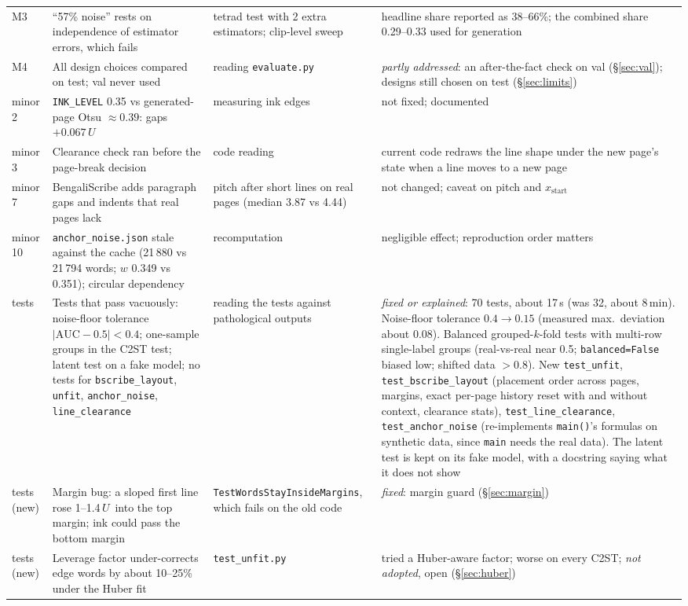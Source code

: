 \documentclass[11pt,a4paper]{article}
\newcommand{\U}{\ensuremath{U}}
\begin{document}
{\begin{longtable}{>{\raggedright\arraybackslash}p{1.1cm}>{\raggedright\arraybackslash}p{5.0cm}>{\raggedright\arraybackslash}p{3.4cm}>{\raggedright\arraybackslash}p{5.0cm}}
M3 & ``57\% noise'' rests on independence of estimator errors, which fails & tetrad test with 2 extra estimators; clip-level sweep & headline share reported as 38--66\%; the combined share 0.29--0.33 used for generation\\
M4 & All design choices compared on test; val never used & reading \texttt{evaluate.py} & \emph{partly addressed}: an after-the-fact check on val (\S\ref{sec:val}); designs still chosen on test (\S\ref{sec:limits})\\
minor 2 & \texttt{INK\_LEVEL} 0.35 vs generated-page Otsu $\approx0.39$: gaps $+0.067\,\U$ & measuring ink edges & not fixed; documented\\
minor 3 & Clearance check ran before the page-break decision & code reading & current code redraws the line shape under the new page's state when a line moves to a new page\\
minor 7 & BengaliScribe adds paragraph gaps and indents that real pages lack & pitch after short lines on real pages (median 3.87 vs 4.44) & not changed; caveat on pitch and $x_\text{start}$\\
minor 10 & \texttt{anchor\_noise.json} stale against the cache (21\,880 vs 21\,794 words; $w$ 0.349 vs 0.351); circular dependency & recomputation & negligible effect; reproduction order matters\\
tests & Tests that pass vacuously: noise-floor tolerance $|\text{AUC}-0.5|<0.4$; one-sample groups in the C2ST test; latent test on a fake model; no tests for \texttt{bscribe\_layout}, \texttt{unfit}, \texttt{anchor\_noise}, \texttt{line\_clearance} & reading the tests against pathological outputs & \emph{fixed or explained}: 70 tests, about 17\,s (was 32, about 8\,min). Noise-floor tolerance $0.4\to0.15$ (measured max.\ deviation about 0.08). Balanced grouped-$k$-fold tests with multi-row single-label groups (real-vs-real near 0.5; \texttt{balanced=False} biased low; shifted data $>0.8$). New \texttt{test\_unfit}, \texttt{test\_bscribe\_layout} (placement order across pages, margins, exact per-page history reset with and without context, clearance stats), \texttt{test\_line\_clearance}, \texttt{test\_anchor\_noise} (re-implements \texttt{main()}'s formulas on synthetic data, since \texttt{main} needs the real data). The latent test is kept on its fake model, with a docstring saying what it does not show\\
tests (new) & Margin bug: a sloped first line rose 1--1.4\,\U\ into the top margin; ink could pass the bottom margin & \texttt{TestWordsStay\allowbreak InsideMargins}, which fails on the old code & \emph{fixed}: margin guard (\S\ref{sec:margin})\\
tests (new) & Leverage factor under-corrects edge words by about 10--25\% under the Huber fit & \texttt{test\_unfit.py} & tried a Huber-aware factor; worse on every C2ST; \emph{not adopted}, open (\S\ref{sec:huber})\\
\end{longtable}
}
\end{document}
